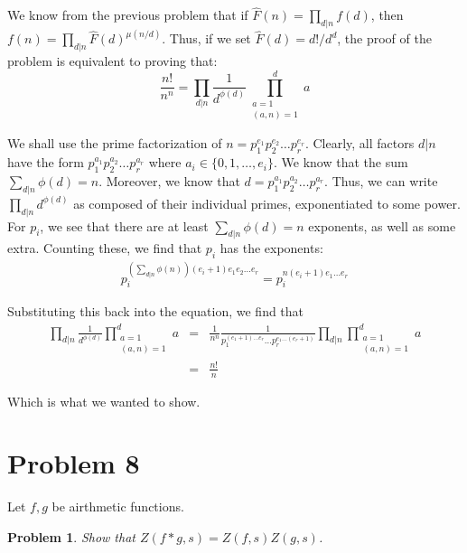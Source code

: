 \documentclass[psamsfonts]{amsart}
\newtheorem{prob}{Problem}[section]
\newenvironment{sol}{{\bfseries Solution}}{\qedsymbol}
\theoremstyle{definition}
\theoremstyle{remark}
\numberwithin{equation}{section}
\begin{document}
\begin{sol}
We know from the previous problem that if $\hat{F}(n) = \prod_{d|n} f(d)$, then $f(n) = \prod_{d|n} \hat{F}(d)^{\mu(n/d)}$. Thus, if we set $\hat{F}(d) = d!/d^d$, the proof of the problem is equivalent to proving that:
\begin{equation}
\frac{n!}{n^n} = \prod_{d|n} \frac{1}{d^{\phi(d)}} \prod_{\substack{a=1\\(a,n)=1}}^d a
\end{equation}

We shall use the prime factorization of $n = p_1^{e_1} p_2^{e_2} \ldots p_r^{e_r}$. Clearly, all factors $d|n$ have the form $p_1^{a_1} p_2^{a_2} \ldots p_r^{a_r}$ where $a_i \in \{0,1, \ldots, e_i \}$. We know that the sum $\sum_{d|n} \phi(d) = n$. Moreover, we know that $d  = p_1^{a_1} p_2^{a_2} \ldots p_r^{a_r}$. Thus, we can write $\prod_{d|n} d^{\phi(d)}$ as composed of their individual primes, exponentiated to some power. For $p_i$, we see that there are at least $\sum_{d|n} \phi(d) = n$ exponents, as well as some extra. Counting these, we find that $p_i$ has the exponents:
\begin{eqnarray}
p_i^{(\sum_{d|n} \phi(n))(e_i + 1)e_1 e_2 \ldots e_r } = p_i^{n (e_i+1) e_1 \ldots e_r}
\end{eqnarray}

Substituting this back into the equation, we find that
\begin{eqnarray}
\prod_{d|n} \frac{1}{d^{\phi(d)}} \prod_{\substack{a=1\\(a,n)=1}}^d a &=& \frac{1}{n^{n}} \frac{1}{p_1^{(e_1 + 1) \ldots e_r} \ldots p_r^{e_1 \ldots (e_r+1)}} \prod_{d|n}  \prod_{\substack{a=1\\(a,n)=1}}^d a \\
&=& \frac{n!}{n}
\end{eqnarray}

Which is what we wanted to show.
\end{sol}

\section{Problem 8}

Let $f,g$ be airthmetic functions.

\begin{prob}
Show that $Z(f * g, s) = Z(f,s) Z(g,s)$. 
\end{prob}
\end{document}
